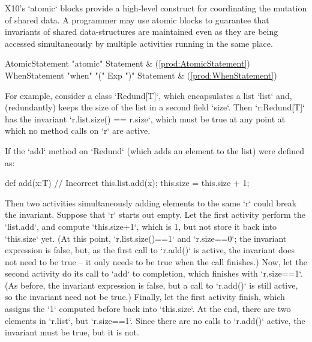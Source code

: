 X10's \xcd`atomic` blocks provide a high-level construct for coordinating
the mutation of shared data. 
A programmer may use atomic blocks to guarantee that invariants of
shared data-structures are maintained even as they are being accessed
simultaneously by multiple activities running in the same place.  

\begin{bbgrammar}
     AtomicStatement \: \xcd"atomic" Statement & (\ref{prod:AtomicStatement}) \\
       WhenStatement \: \xcd"when" \xcd"(" Exp \xcd")" Statement & (\ref{prod:WhenStatement}) \\
\end{bbgrammar}

For example, consider a class \xcd`Redund[T]`, which encapsulates a list
\xcd`list` and, (redundantly) keeps the size of the list in a second field
\xcd`size`.  Then \xcd`r:Redund[T]` has the invariant 
\xcd`r.list.size() == r.size`, which must be true at any point at which
no method calls on \xcd`r` are active.

If the \xcd`add` method on \xcd`Redund` (which adds an element to the list) 
were defined as: 
\begin{xten}
def add(x:T) { // Incorrect
  this.list.add(x);
  this.size = this.size + 1;
}
\end{xten}
Then two activities simultaneously adding elements to the same \xcd`r` could break the
invariant.  Suppose that \xcd`r` starts out empty.  Let the first activity
perform the \xcd`list.add`, and compute \xcd`this.size+1`, which is 1, but not store it
back into \xcd`this.size` yet.  
(At this point, \xcd`r.list.size()==1` and \xcd`r.size==0`; the invariant
expression is false, but, as the first call to \xcd`r.add()` is active, the
invariant does not need to be true -- it only needs to be true when the
call finishes.)
Now, let the second activity do its call to
\xcd`add` to completion, which finishes with \xcd`r.size==1`.  
(As before, the invariant expression is false, but a call to \xcd`r.add()` is
still active, so the invariant need not be true.)
Finally, let
the first activity finish, which assigns the \xcd`1` computed before back into
\xcd`this.size`.  At the end, there are two elements in \xcd`r.list`, but
\xcd`r.size==1`. Since there are no calls to \xcd`r.add()` active, the
invariant must be true, but it is not.


